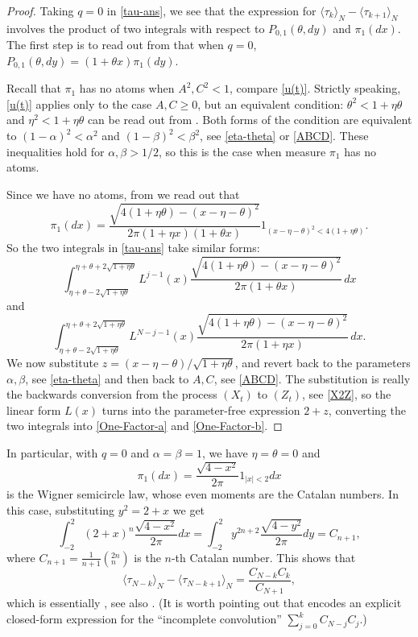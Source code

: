 \documentclass{amsart}
\theoremstyle{definition}
\theoremstyle{remark}
\theoremstyle{remark}
\theoremstyle{definition}
\numberwithin{equation}{section}
\begin{document}
 \begin{proof}
 Taking $q=0$ in \eqref{tau-ans}, we see that  the expression for $\langle \tau_k\rangle_N-\langle \tau_{k+1}\rangle_N$ involves the product of two
 integrals with respect to $P_{0,1}(\theta,dy)$ and $\pi_1(dx)$.
   The first step is to read out from \cite[Remark 4.2]{Bryc-Wesolowski-2013-evo} that when $q=0$,
   $P_{0,1}(\theta,dy)=(1+\theta x)\pi_1(dy)$.

   Recall that $\pi_1$ has no atoms when $A^2,C^2<1$, compare \eqref{u(t)}. Strictly speaking, \eqref{u(t)} applies only to the case  $A,C\geq 0$, but an equivalent condition: $\theta^2<1+\eta\theta$ and $\eta^2<1+\eta\theta$ can be read out from \cite[Section 3]{Bryc-Wesolowski-04}. Both forms of the condition are equivalent to $(1-\alpha)^2<\alpha^2$ and $(1-\beta)^2<\beta^2$, see \eqref{eta-theta} or \eqref{ABCD}. These inequalities hold for $\alpha,\beta>1/2$, so this is the case when measure $\pi_1$ has no atoms.

    Since we   have no atoms,
   from \cite{Bryc-Wesolowski-04} we read out  that
 \begin{equation}\label{EQ: distr}
\pi_{1}(dx)=
\frac{
\sqrt{4  (1+\eta\theta)-(x-\eta-\theta)^2}}
{2\pi(1+\eta x )(1+\theta x)}
1_{(x-\eta-\theta)^2<4(1+\eta\theta)}.
\end{equation}
So the two integrals in  \eqref{tau-ans} take similar forms:
$$\int_{\eta+\theta-2\sqrt{1+\eta\theta}}^{\eta+\theta+2\sqrt{1+\eta\theta}}  L^{j-1}(x)\frac{
\sqrt{4  (1+\eta\theta)-(x-\eta-\theta)^2}}
{2\pi (1+\theta x)}
\,dx$$
and
$$\int_{\eta+\theta-2\sqrt{1+\eta\theta}}^{\eta+\theta+2\sqrt{1+\eta\theta}}  L^{N-j-1}(x)\frac{
\sqrt{4  (1+\eta\theta)-(x-\eta-\theta)^2}}
{2\pi (1+\eta x)}
\,dx.$$
We now substitute $z=(x-\eta-\theta)/\sqrt{1+\eta \theta}$, and revert back to the parameters $\alpha,\beta$, see \eqref{eta-theta} and then back to $A,C$, see
\eqref{ABCD}. The substitution is really the backwards conversion from the process $(X_t)$ to $(Z_t)$, see \eqref{X2Z}, so the linear form
 $L(x)$ turns into the parameter-free expression $2+z$, converting the two integrals into \eqref{One-Factor-a} and \eqref{One-Factor-b}.

 \end{proof}

In particular, with $q=0$ and $\alpha=\beta=1$, we have $\eta=\theta=0$ and
$$
\pi_1(dx)=\frac{\sqrt{4-x^2}}{2\pi}1_{|x|<2} dx $$
 is the Wigner semicircle law, whose even moments   are the Catalan numbers. In this case, substituting $y^2=2+x$ we get  {}
$$\int_{-2}^2 (2+x)^n  \frac{\sqrt{4-x^2}}{2\pi} dx =\int_{-2}^2 y^{2n+2}\frac{\sqrt{4-y^2}}{2\pi} dy= C_{n+1},
$$
 where $C_{n+1}=\frac{1}{n+1}\left(^{2n}_n\right)$ is the $n$-th Catalan number.
 This shows that
 $$ \langle \tau_{N-k}\rangle_N-\langle \tau_{N-k+1}\rangle_N=\frac{C_{N-k}C_k}{C_{N+1}},$$
  which is essentially \cite[formula (47)]{derrida1992exact}, see also \cite[formula (84)]{derrida1993exact}.
   (It is worth pointing out  that \cite[formula (48)]{derrida1992exact} encodes an explicit closed-form expression for
  the ``incomplete convolution'' $\sum_{j=0}^k  C_{N-j}C_j$.)
  
\end{document}
